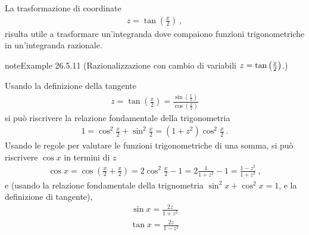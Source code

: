 \documentclass[letterpaper,10pt,italian]{jupyterBook}
\begin{document}
\sphinxAtStartPar
{} La trasformazione di coordinate
\begin{equation*}
\begin{split}z = \tan\left( \frac{x}{2} \right) \ ,\end{split}
\end{equation*}
\sphinxAtStartPar
risulta utile a trasformare un’integranda dove compaiono funzioni trigonometriche in un’integranda razionale.
\label{ch/infinitesimal_calculus/integrals:integrals-methods-sub-10}
\begin{sphinxadmonition}{note}{Example 26.5.11 (Razionalizzazione con cambio di variabili \protect\(z = \tan\left( \frac{x}{2} \right)\protect\).)}



\sphinxAtStartPar
Usando la definizione della tangente
\begin{equation*}
\begin{split}z = \tan \left(\frac{x}{2}\right) = \frac{\sin \left(\frac{x}{2}\right)}{\cos \left(\frac{x}{2}\right)}\end{split}
\end{equation*}
\sphinxAtStartPar
si può riscrivere la relazione fondamentale della trigonometria
\begin{equation*}
\begin{split}1 = \cos^2 \frac{x}{2} + \sin^2 \frac{x}{2} = (1 + z^2) \cos^2 \frac{x}{2}\ .\end{split}
\end{equation*}
\sphinxAtStartPar
Usando le regole per valutare le funzioni trigonometriche di una somma, si può riscrivere \(\cos x\) in termini di \(z\)
\begin{equation*}
\begin{split}\cos x = \cos \left( \frac{x}{2} + \frac{x}{2} \right) = 2 \cos^2 \frac{x}{2} - 1 = 2 \frac{1}{1+z^2} - 1 = \frac{1-z^2}{1+z^2} \ ,\end{split}
\end{equation*}
\sphinxAtStartPar
e (usando la relazione fondamentale della trignometria \(\sin^2 x + \cos^2 x = 1\), e la definizione di tangente),
\begin{equation*}
\begin{split}\sin x = \frac{2 z}{1 + z^2}\end{split}
\end{equation*}\begin{equation*}
\begin{split}\tan x = \frac{2 z}{1 - z^2}\end{split}
\end{equation*}\end{sphinxadmonition}
\end{document}
